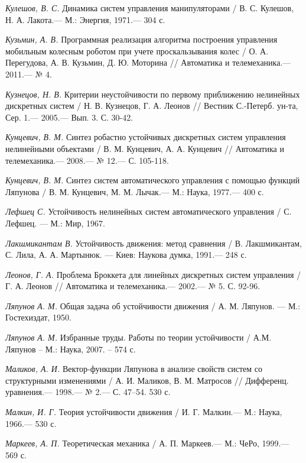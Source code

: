\begin{thebibliography}{10}
	
	{\it Кулешов, В. С.} Динамика систем управления манипуляторами / В. С. Кулешов,
	Н. А. Лакота.— М.: Энергия, 1971.— 304 с.
	
	{\it Кузьмин, А. В.} Программная реализация алгоритма построения управления мобильным колесным роботом при учете проскальзывания колес / О. А. Перегудова, А. В. Кузьмин, Д. Ю. Моторина // Автоматика и телемеханика.—  2011.— № 4.
	
	{\it Кузнецов, Н. В.} Критерии неустойчивости по первому приближению нелинейных дискретных систем / Н. В. Кузнецов, Г. А. Леонов // Вестник С.-Петерб. ун-та, Сер. 1.—  2005.— Вып. 3. С. 30-42.
	
	{\it Кунцевич, В. М.} Синтез робастно устойчивых дискретных систем управления нелинейными объектами
	/ В. М. Кунцевич, А. А. Кунцевич // Автоматика и телемеханика.— 2008.— № 12.— С. 105-118.
	
	{\it Кунцевич, В. М.} Синтез систем автоматического управления с помощью функций
	Ляпунова / В. М. Кунцевич, М. М. Лычак.— М.: Наука, 1977.— 400 с.
	
	{\it Лефшец С.} Устойчивость нелинейных систем автоматического управления /
	С. Лефшец. — М.: Мир, 1967.
	
	{\it Лакшмикантам В.} Устойчивость движения: метод сравнения / В. Лакшмикантам, С. Лила, А. А. Мартынюк. — Киев: Наукова думка, 1991.— 248 с.
	
	{\it Леонов, Г. А.} Проблема Броккета для линейных дискретных систем управления / Г. А. Леонов // Автоматика и телемеханика.—  2002.— № 5. С. 92-96.
	
	{\it Ляпунов А. М.} Общая задача об устойчивости движения / А. М. Ляпунов. — М.: Гостехиздат, 1950.
	
	{\it Ляпунов А. М.} Избранные труды. Работы по теории устойчивости / А.М. Ляпунов – М.: Наука, 2007. – 574 с.
	
	{\it Маликов, А. И.} Вектор-функции Ляпунова в анализе свойств систем со структурными изменениями / А. И. Маликов, В. М. Матросов // Дифференц. уравнения.— 1998.— № 2.— С. 47–54.
	530 с.
	
	{\it Малкин, И. Г.} Теория устойчивости движения / И. Г. Малкин.— М.: Наука, 1966.—
	530 с.
	
	{\it Маркеев, А. П.} Теоретическая механика / А. П. Маркеев.— М.: ЧеРо, 1999.— 569 с.
	

\end{thebibliography}
